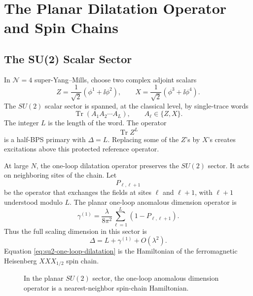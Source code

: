 \chapter{The Planar Dilatation Operator and Spin Chains}
\label{ch:volume-iii-planar-dilatation-operator-spin-chains}

\section{The SU(2) Scalar Sector}

In \(\mathcal N=4\) super-Yang--Mills, choose two complex adjoint scalars
\[
  Z=\frac1{\sqrt2}(\phi^1+\ii\phi^2),
  \qquad
  X=\frac1{\sqrt2}(\phi^3+\ii\phi^4).
\]
The \(SU(2)\) scalar sector is spanned, at the classical level, by
single-trace words
\begin{equation}
  \operatorname{Tr}(A_1A_2\cdots A_L),
  \qquad
  A_\ell\in\{Z,X\}.
  \label{eq:su2-sector-single-trace-word}
\end{equation}
The integer \(L\) is the length of the word.  The operator
\[
  \operatorname{Tr}Z^L
\]
is a half-BPS primary with \(\Delta=L\).  Replacing some of the \(Z\)'s by
\(X\)'s creates excitations above this protected reference operator.

At large \(N\), the one-loop dilatation operator preserves the \(SU(2)\)
sector.  It acts on neighboring sites of the chain.  Let
\[
  P_{\ell,\ell+1}
\]
be the operator that exchanges the fields at sites \(\ell\) and \(\ell+1\),
with \(\ell+1\) understood modulo \(L\).  The planar one-loop anomalous
dimension operator is
\begin{equation}
  \gamma^{(1)}
  =
  \frac{\lambda}{8\pi^2}
  \sum_{\ell=1}^{L}
  \left(1-P_{\ell,\ell+1}\right).
  \label{eq:su2-one-loop-dilatation}
\end{equation}
Thus the full scaling dimension in this sector is
\[
  \Delta
  =
  L+\gamma^{(1)}+O(\lambda^2).
\]
Equation \eqref{eq:su2-one-loop-dilatation} is the Hamiltonian of the
ferromagnetic Heisenberg \(XXX_{1/2}\) spin chain.

\begin{figure}[H]
  \centering
  \caption{In the planar \(SU(2)\) sector, the one-loop anomalous dimension
  operator is a nearest-neighbor spin-chain Hamiltonian.}
  \label{fig:su2-sector-nearest-neighbor-chain}
\end{figure}


